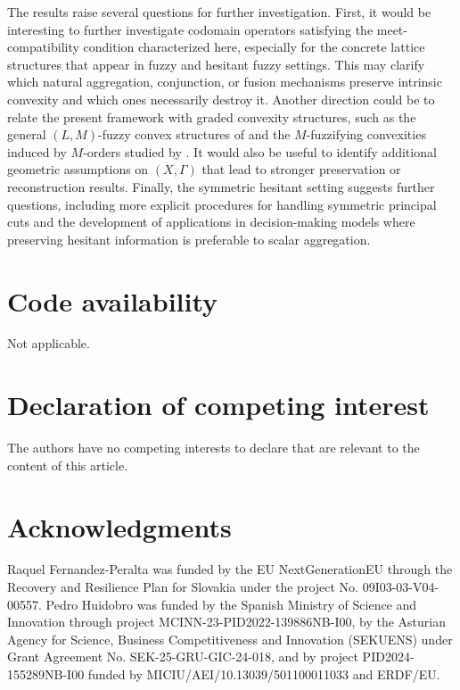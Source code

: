\documentclass[11pt,a4paper]{article}
\begin{document}
The results raise several questions for further investigation. First, it would be interesting to further investigate codomain operators satisfying the meet-compatibility condition characterized here, especially for the concrete lattice structures that appear in fuzzy and hesitant fuzzy settings. This may clarify which natural aggregation, conjunction, or fusion mechanisms preserve intrinsic convexity and which ones necessarily destroy it. Another direction could be to relate the present framework with graded convexity structures, such as the general \((L,M)\)-fuzzy convex structures of \citet{ShiXiu2017} and the \(M\)-fuzzifying convexities induced by \(M\)-orders studied by \citet{LiShi2018}. It would also be useful to identify additional geometric assumptions on \((X,\Gamma)\) that lead to stronger preservation or reconstruction results. Finally, the symmetric hesitant setting suggests further questions, including more explicit procedures for handling symmetric principal cuts and the development of applications in decision-making models where preserving hesitant information is preferable to scalar aggregation.











\section*{Code availability}

Not applicable.


\section*{Declaration of competing interest}
 
The authors have no competing interests to declare that are relevant to the content of this article. 


\section*{Acknowledgments}
   
Raquel Fernandez-Peralta was funded by the EU NextGenerationEU through the Recovery and Resilience Plan for Slovakia under the project No. 09I03-03-V04-00557. Pedro Huidobro was funded by the Spanish Ministry of Science and Innovation through project MCINN-23-PID2022-139886NB-I00, by the Asturian Agency for Science, Business Competitiveness and Innovation (SEKUENS) under Grant Agreement No. SEK-25-GRU-GIC-24-018, and by project PID2024-155289NB-I00 funded by MICIU/AEI/10.13039/501100011033 and ERDF/EU.
\end{document}
